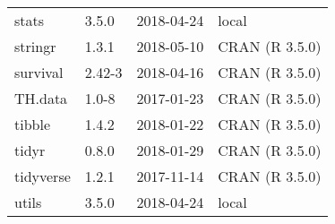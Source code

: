 \documentclass[]{article}
\begin{document}
\begin{table}[!h]
\begin{tabular}[t]{llll}
stats & 3.5.0 & 2018-04-24 & local\\
stringr & 1.3.1 & 2018-05-10 & CRAN (R 3.5.0)\\
survival & 2.42-3 & 2018-04-16 & CRAN (R 3.5.0)\\
TH.data & 1.0-8 & 2017-01-23 & CRAN (R 3.5.0)\\
tibble & 1.4.2 & 2018-01-22 & CRAN (R 3.5.0)\\
tidyr & 0.8.0 & 2018-01-29 & CRAN (R 3.5.0)\\
tidyverse & 1.2.1 & 2017-11-14 & CRAN (R 3.5.0)\\
utils & 3.5.0 & 2018-04-24 & local\\
\bottomrule
\end{tabular}
\end{table}
\end{document}
